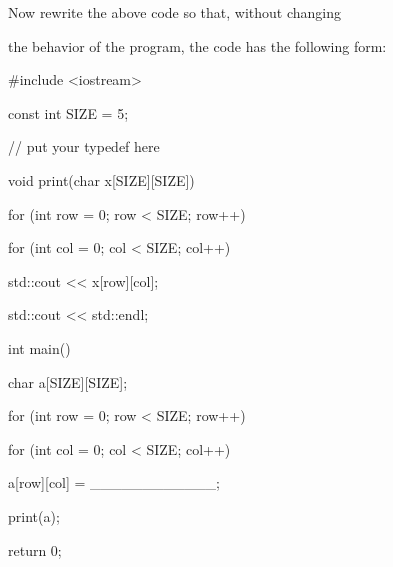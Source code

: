 Now rewrite the above code so that, without changing

the behavior of the program, the code has the following form:



\begin{consolethree}[escapeinside=||]

#include <iostream>



const int SIZE = 5;



// put your typedef here



void print(char x[SIZE][SIZE])

{

    for (int row = 0; row < SIZE; row++)

    {

        for (int col = 0; col < SIZE; col++)

        {

            std::cout << x[row][col];

        }

        std::cout << std::endl;

    }

}



int main()

{

    char a[SIZE][SIZE];



    for (int row = 0; row < SIZE; row++)

    {

        for (int col = 0; col < SIZE; col++)

        {

            a[row][col] = ____________;

        }

    }



    print(a);

    return 0;

}

\end{consolethree}


